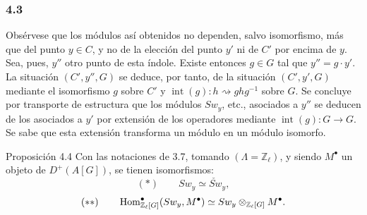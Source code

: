 \subsubsection*{4.3}

Obsérvese que los módulos así obtenidos no dependen, salvo isomorfismo, más que del punto $y\in C$, y no de la elección del punto $y'$ ni de $C'$ por encima de $y$. Sea, pues, $y''$ otro punto de esta índole. Existe entonces $g\in G$ tal que $y''=g\cdot y'$. La situación $(C',y'',G)$ se deduce, por tanto, de la situación $(C',y',G)$ mediante el isomorfismo $g$ sobre $C'$ y $\operatorname{int}(g):h\rightsquigarrow ghg^{-1}$ sobre $G$. Se concluye por transporte de estructura que los módulos $Sw_y$, etc., asociados a $y''$ se deducen de los asociados a $y'$ por extensión de los operadores mediante $\operatorname{int}(g):G\to G$. Se sabe que esta extensión transforma un módulo en un módulo isomorfo.

\begin{statement}{Proposición 4.4}
Con las notaciones de 3.7, tomando $(\Lambda=\mathbb Z_\ell)$, y siendo $M^\bullet$ un objeto de $D^+(A[G])$, se tienen isomorfismos:
\[
(*)\qquad Sw_y\simeq \check{Sw}_y,
\]
\[
(**)\qquad
\operatorname{Hom}^\bullet_{\mathbb Z_\ell[G]}(Sw_y,M^\bullet)
\simeq Sw_y\otimes_{\mathbb Z_\ell[G]}M^\bullet.
\]
\end{statement}
